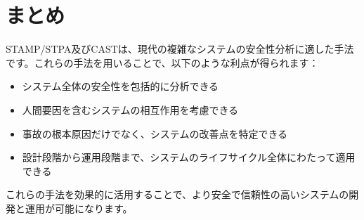 

\section{まとめ}

STAMP/STPA及びCASTは、現代の複雑なシステムの安全性分析に適した手法です。これらの手法を用いることで、以下のような利点が得られます：

\begin{itemize}
    \item システム全体の安全性を包括的に分析できる
    \item 人間要因を含むシステムの相互作用を考慮できる
    \item 事故の根本原因だけでなく、システムの改善点を特定できる
    \item 設計段階から運用段階まで、システムのライフサイクル全体にわたって適用できる
\end{itemize}

これらの手法を効果的に活用することで、より安全で信頼性の高いシステムの開発と運用が可能になります。

